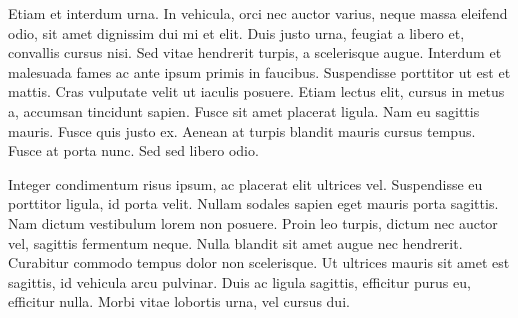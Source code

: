Etiam et interdum urna. In vehicula, orci nec auctor varius, neque massa eleifend odio, sit amet dignissim dui mi et elit. Duis justo urna, feugiat a libero et, convallis cursus nisi. Sed vitae hendrerit turpis, a scelerisque augue. Interdum et malesuada fames ac ante ipsum primis in faucibus. Suspendisse porttitor ut est et mattis. Cras vulputate velit ut iaculis posuere. Etiam lectus elit, cursus in metus a, accumsan tincidunt sapien. Fusce sit amet placerat ligula. Nam eu sagittis mauris. Fusce quis justo ex. Aenean at turpis blandit mauris cursus tempus. Fusce at porta nunc. Sed sed libero odio.

Integer condimentum risus ipsum, ac placerat elit ultrices vel. Suspendisse eu porttitor ligula, id porta velit. Nullam sodales sapien eget mauris porta sagittis. Nam dictum vestibulum lorem non posuere. Proin leo turpis, dictum nec auctor vel, sagittis fermentum neque. Nulla blandit sit amet augue nec hendrerit. Curabitur commodo tempus dolor non scelerisque. Ut ultrices mauris sit amet est sagittis, id vehicula arcu pulvinar. Duis ac ligula sagittis, efficitur purus eu, efficitur nulla. Morbi vitae lobortis urna, vel cursus dui.